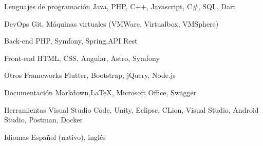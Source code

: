 

\begin{cvskills}

  \cvskill
    {Lenguajes de programación} %
    {Java, PHP, C++, Javascript, C\#, SQL, Dart} %

  \cvskill
    {DevOps} %
    {Git, Máquinas virtuales (VMWare, Virtualbox, VMSphere)} %

  \cvskill
    {Back-end} %
    {PHP, Symfony, Spring,API Rest} %

  \cvskill
    {Front-end} %
    {HTML, CSS, Angular, Astro, Symfony} %

  \cvskill
    {Otros Frameworks} %
    {Flutter, Bootstrap, jQuery, Node.js} %

  \cvskill
    {Documentación}
    {Markdown,LaTeX, Microsoft Office, Swagger}

  \cvskill
    {Herramientas}
    {Visual Studio Code, Unity, Eclipse, CLion, Visual Studio, Android Studio, Postman, Docker}

  \cvskill
    {Idiomas} %
    {Español (nativo), inglés} %

\end{cvskills}
